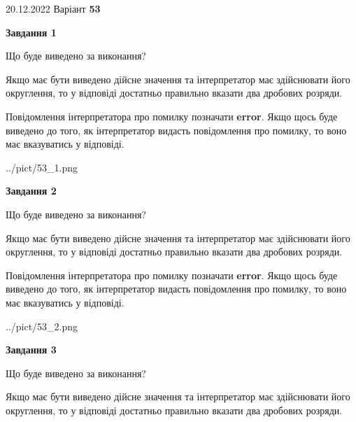 \documentclass[12pt, ukrainian]{article}
\begin{document}
{20.12.2022 Варіант \No \textbf { 53 }\par}
{
\begin {Large}

{\begin {center}\textbf{Завдання 1}\end {center}}\par
Що буде виведено за виконання? \par

Якщо має бути виведено дійсне значення та інтерпретатор має здійснювати його округлення, 
то у відповіді достатньо правильно вказати два дробових розряди.

Повідомлення інтерпретатора про помилку позначати \textbf{error}.
Якщо щось буде виведено до того, як інтерпретатор видасть повідомлення про помилку, 
то воно має вказуватись у відповіді. \par

\begin{center}
	{../pict/53_1.png}
\end{center}
\newpage

{\begin {center}\textbf{Завдання 2}\end {center}}\par
Що буде виведено за виконання? \par

Якщо має бути виведено дійсне значення та інтерпретатор має здійснювати його округлення, 
то у відповіді достатньо правильно вказати два дробових розряди.

Повідомлення інтерпретатора про помилку позначати \textbf{error}.
Якщо щось буде виведено до того, як інтерпретатор видасть повідомлення про помилку, 
то воно має вказуватись у відповіді. \par

\begin{center}
	{../pict/53_2.png}
\end{center}
\newpage

{\begin {center}\textbf{Завдання 3}\end {center}}\par
Що буде виведено за виконання? \par

Якщо має бути виведено дійсне значення та інтерпретатор має здійснювати його округлення, 
то у відповіді достатньо правильно вказати два дробових розряди.


\end{Large}}
\end{document}
